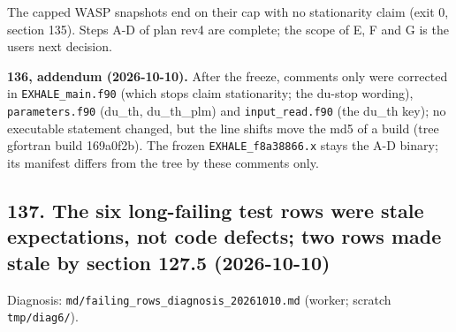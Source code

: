\documentclass[english,a4paper]{my_memo}
\begin{document}
The capped WASP snapshots end on their cap with no stationarity claim (exit 0,
section 135). Steps A-D of plan rev4 are complete; the scope of E, F and G is
the user\textquotesingle s next decision.

\textbf{136, addendum (2026-10-10).} After the freeze, comments only were corrected
in \texttt{EXHALE\_main.f90} (which stops claim stationarity; the du-stop wording),
\texttt{parameters.f90} (du\_th, du\_th\_plm) and \texttt{input\_read.f90} (the du\_th key); no
executable statement changed, but the line shifts move the md5 of a build
(tree gfortran build 169a0f2b). The frozen \texttt{EXHALE\_f8a38866.x} stays the A-D
binary; its manifest differs from the tree by these comments only.

\subsection{137. The six long-failing test rows were stale expectations, not code defects; two rows made stale by section 127.5 (2026-10-10)}\label{137-the-six-long-failing-test-rows-were-stale-expectations-not-code-defects-two-rows-made-stale-by-section-1275-2026-10-10}

Diagnosis: \texttt{md/failing\_rows\_diagnosis\_20261010.md} (worker; scratch
\texttt{tmp/diag6/}).
\end{document}
